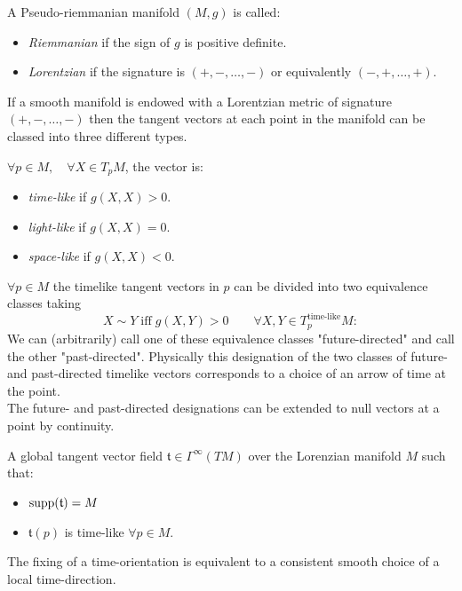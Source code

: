 \documentclass[a4paper,12pt]{scrartcl}    %
\begin{document}
	\begin{notationfix}
		A Pseudo-riemmanian manifold $(M,g)$ is called:
		 \begin{itemize}
		 	\item \emph{Riemmanian} if the sign of $g$ is positive definite.%
		 	\item \emph{Lorentzian} if the signature is $(+, -, \ldots,- )$ or equivalently $(-,+,\ldots,+)$.
		 \end{itemize}
	\end{notationfix}

	\begin{observation}
		If a smooth manifold is endowed with a Lorentzian metric of signature $(+, -, \ldots, -)$ then the tangent vectors at each point in the manifold can be classed into three different types. 
		\begin{notationfix}
			$\forall p \in M, \quad \forall X \in T_pM$, the vector is:
			\begin{itemize}
				\item \emph{time-like} if $g(X,X)>0$.
				\item \emph{light-like} if $g(X,X)=0$.
				\item \emph{space-like} if $g(X,X)<0$.
			\end{itemize}
		\end{notationfix}
	\end{observation}

	\begin{observation}
		$\forall p\in M$ the timelike tangent vectors in $p$ can be divided into two equivalence classes taking
		\begin{displaymath}
			X \sim Y \; \textrm{iff} \; g(X,Y)>0 \qquad \forall X,Y \in T^\textrm{time-like}_pM:
		\end{displaymath}
		We can (arbitrarily) call one of these equivalence classes "future-directed" and call the other "past-directed". Physically this designation of the two classes of future- and past-directed timelike vectors corresponds to a choice of an arrow of time at the point. 
		\\
		The future- and past-directed designations can be extended to null vectors at a point by continuity.
	\end{observation}
	
	\begin{definition}
		A global tangent vector field  $\mathfrak{t}\in \Gamma^\infty(TM)$ over the Lorenzian manifold $M$ such that:
		\begin{itemize}
			\item $\textrm{supp}(\mathfrak{t}) = M$
			\item $\mathfrak{t}(p)$ is time-like $\forall p \in M$.
		\end{itemize}
	\end{definition}
	\begin{observation}
		The fixing of a time-orientation is equivalent to a consistent smooth choice of a local time-direction.
	\end{observation}	
	
\end{document}
